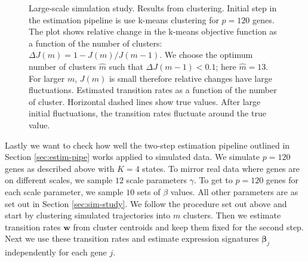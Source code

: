 \begin{figure}
  \centering
  \caption{Large-scale simulation study. Results from clustering.  Initial step in the estimation pipeline is use k-means clustering for $p=120$ genes. The plot shows relative change in the k-means objective function as a function of the number of clusters: $\Delta J(m) = 1 - J(m) / J(m - 1)$. We choose the optimum number of clusters $\hat{m}$ such that $\Delta J(m - 1) < 0.1$; here $\hat{m} = 13$. For larger $m$, $J(m)$ is small therefore relative changes have large fluctuations.  Estimated transition rates as a function of the number of cluster. Horizontal dashed lines show true values. After large initial fluctuations, the transition rates fluctuate around the true value.}
  \label{fig:lrg-sim-clust}
\end{figure}


Lastly we want to check how well the two-step estimation pipeline outlined in Section \ref{sec:estim-pipe} works applied to simulated data. We simulate $p=120$ genes as described above with $K=4$ states. To mirror real data where genes are on different scales, we sample $12$ scale parameters $\gamma$. To get to $p=120$ genes for each scale parameter, we sample $10$ sets of $\beta$ values. All other parameters are as set out in Section \ref{sec:sim-study}. We follow the procedure set out above and start by clustering simulated trajectories into $m$ clusters. Then we estimate transition rates $\mathbf{w}$ from cluster centroids and keep them fixed for the second step. Next we use these transition rates and estimate expression signatures $\boldsymbol\beta_j$ independently for each gene $j$.

